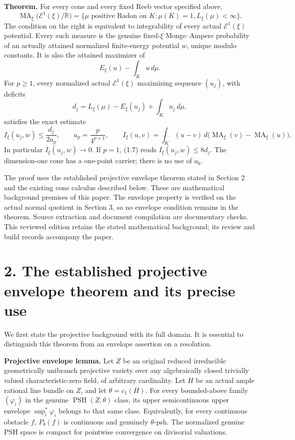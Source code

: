 \documentclass[
  10pt,
]{article}
\begin{document}
\textbf{Theorem.} For every cone and every fixed Reeb vector specified
above, \[
 \operatorname{MA}_\xi\bigl(\mathcal E^1(\xi)/\mathbb R\bigr)
 =\{\mu\text{ positive Radon on }K:\mu(K)=1, L_\xi(\mu)<\infty\}.
                                                               \tag{1.6}
\] The condition on the right is equivalent to integrability of every
actual \(\mathcal E^1(\xi)\) potential. Every such measure is the
genuine fixed-\(\xi\) Monge--Ampere probability of an actually attained
normalized finite-energy potential \(w\), unique modulo constants. It is
also the attained maximizer of \[
                  E_\xi(u)-\int_Ku\,d\mu.
\] For \(p\geq1\), every normalized actual \(\mathcal E^1(\xi)\)
maximizing sequence \((u_j)\), with deficits \[
 d_j=L_\xi(\mu)-E_\xi(u_j)+\int_Ku_j\,d\mu,
\] satisfies the exact estimate \[
 I_\xi(u_j,w)\leq\frac{d_j}{2a_p},\qquad
 a_p=\frac{p}{4^{p+1}},\qquad
 I_\xi(u,v)=\int_K(u-v)\,d\bigl(\operatorname{MA}_\xi(v)
                                      -\operatorname{MA}_\xi(u)\bigr).
                                                               \tag{1.7}
\] In particular \(I_\xi(u_j,w)\to0\). If \(p=1\), (1.7) reads
\(I_\xi(u_j,w)\leq8d_j\). The dimension-one cone has a one-point
carrier; there is no use of \(a_0\).

The proof uses the established projective envelope theorem stated in
Section 2 and the existing cone calculus described below. These are
mathematical background premises of this paper. The envelope property is
verified on the actual normal quotient in Section 3, so no envelope
condition remains in the theorem. Source extraction and document
compilation are documentary checks. This reviewed edition retains the
stated mathematical background; its review and build records accompany
the paper.

\section{2. The established projective envelope theorem and its precise
use}\label{the-established-projective-envelope-theorem-and-its-precise-use}

We first state the projective background with its full domain. It is
essential to distinguish this theorem from an envelope assertion on a
resolution.

\textbf{Projective envelope lemma.} Let \(Z\) be an original reduced
irreducible geometrically unibranch projective variety over any
algebraically closed trivially valued characteristic-zero field, of
arbitrary cardinality. Let \(H\) be an actual ample rational line bundle
on \(Z\), and let \(\theta=c_1(H)\). For every bounded-above family
\((\varphi_i)\) in the genuine \(\operatorname{PSH}(Z,\theta)\) class,
its upper semicontinuous upper envelope \(\sup_i^*\varphi_i\) belongs to
that same class. Equivalently, for every continuous obstacle \(f\),
\(P_\theta(f)\) is continuous and genuinely \(\theta\)-psh. The
normalized genuine PSH space is compact for pointwise convergence on
divisorial valuations.
\end{document}
